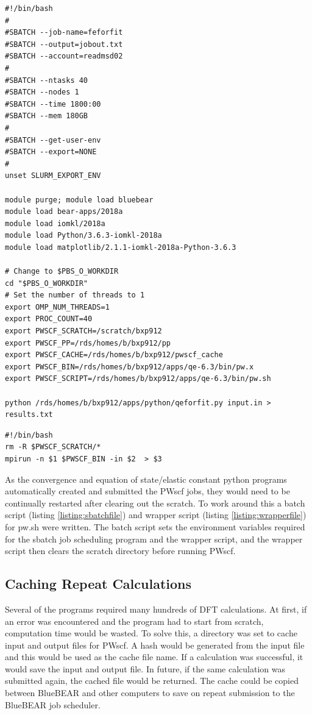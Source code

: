 \begin{lstlisting}[style=sBash,caption={Sbatch file},label={listing:sbatchfile}]
#!/bin/bash
#
#SBATCH --job-name=feforfit
#SBATCH --output=jobout.txt
#SBATCH --account=readmsd02
#
#SBATCH --ntasks 40
#SBATCH --nodes 1
#SBATCH --time 1800:00
#SBATCH --mem 180GB
#
#SBATCH --get-user-env
#SBATCH --export=NONE
#
unset SLURM_EXPORT_ENV

module purge; module load bluebear
module load bear-apps/2018a
module load iomkl/2018a
module load Python/3.6.3-iomkl-2018a
module load matplotlib/2.1.1-iomkl-2018a-Python-3.6.3

# Change to $PBS_O_WORKDIR
cd "$PBS_O_WORKDIR"
# Set the number of threads to 1
export OMP_NUM_THREADS=1
export PROC_COUNT=40
export PWSCF_SCRATCH=/scratch/bxp912
export PWSCF_PP=/rds/homes/b/bxp912/pp
export PWSCF_CACHE=/rds/homes/b/bxp912/pwscf_cache
export PWSCF_BIN=/rds/homes/b/bxp912/apps/qe-6.3/bin/pw.x
export PWSCF_SCRIPT=/rds/homes/b/bxp912/apps/qe-6.3/bin/pw.sh

python /rds/homes/b/bxp912/apps/python/qeforfit.py input.in > results.txt
\end{lstlisting}

\begin{lstlisting}[style=sBash,caption={Wrapper file},label={listing:wrapperfile}]
#!/bin/bash
rm -R $PWSCF_SCRATCH/*
mpirun -n $1 $PWSCF_BIN -in $2  > $3 
\end{lstlisting}

As the convergence and equation of state/elastic constant python programs automatically created and submitted the PWscf jobs, they would need to be continually restarted after clearing out the scratch.  To work around this a batch script (listing \ref{listing:sbatchfile}) and wrapper script (listing \ref{listing:wrapperfile}) for pw.sh were written.  The batch script sets the environment variables required for the sbatch job scheduling program and the wrapper script, and the wrapper script then clears the scratch directory before running PWscf.


\subsection{Caching Repeat Calculations}

Several of the programs required many hundreds of DFT calculations.  At first, if an error was encountered and the program had to start from scratch, computation time would be wasted.  To solve this, a directory was set to cache input and output files for PWscf.  A hash would be generated from the input file and this would be used as the cache file name.  If a calculation was successful, it would save the input and output file.  In future, if the same calculation was submitted again, the cached file would be returned.  The cache could be copied between BlueBEAR and other computers to save on repeat submission to the BlueBEAR job scheduler.



